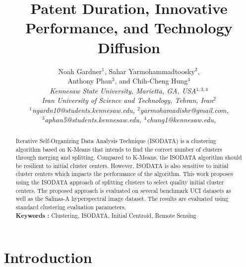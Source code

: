 \documentclass[a4paper,10pt]{article}
\begin{document}
\title{\bf Patent Duration, Innovative Performance, and Technology Diffusion}
\author{Noah Gardner$^1$,
      Sahar Yarmohammadtoosky$^2$, \\
      Anthony Phan$^3$,
      and Chih-Cheng Hung$^4$\\[1ex]
      \sl \small Kennesaw State University,
      Marietta, GA, USA$^{1, 3, 4}$\\
      \sl \small Iran University of Science and Technology,
      Tehran, Iran$^2$\\[1ex]
      \small $^1$ngardn10@students.kennesaw.edu, 
      \small $^2$yarmohamadishr@gmail.com, \\
      \small $^3$aphan5@students.kennesaw.edu,
      \small $^4$chung1@kennesaw.edu, \\}
\date{}
\maketitle

\begin{abstract}
      \noindent 
      Iterative Self-Organizing Data Analysis Technique (ISODATA) is a clustering
      algorithm based on K-Means that intends to find the correct number of
      clusters through merging and splitting. Compared to K-Means, the ISODATA
      algorithm should be resilient to initial cluster centers. However, ISODATA
      is also sensitive to initial cluster centers which impacts the performance
      of the algorithm. This work proposes using the ISODATA approach of splitting
      clusters to select quality initial cluster centers. The proposed approach is
      evaluated on several benchmark UCI datasets as well as the Salinas-A
      hyperspectral image dataset. The results are evaluated using standard
      clustering evaluation parameters. \\
      {\bf Keywords :} Clustering, ISODATA, Initial Centroid, Remote Sensing
\end{abstract}




\section{Introduction}
\end{document}
